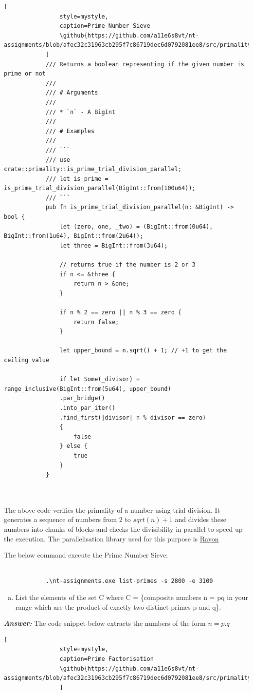 \documentclass[11pt,a4paper]{article}
\newcommand{\github}[1]{%
	\href{#1}{\faGithubSquare}%
}
\begin{document}
\begin{enumerate}[1.]
\begin{flushleft}
\begin{lstlisting}[
				style=mystyle, 
				caption=Prime Number Sieve
				\github{https://github.com/a11e6s8vt/nt-assignments/blob/afec32c31963cb295f7c86719dec6d0792081ee8/src/primality.rs\#L57}        
			]
			/// Returns a boolean representing if the given number is prime or not
			///
			/// # Arguments
			///
			/// * `n` - A BigInt
			///
			/// # Examples
			///
			/// ```
			/// use crate::primality::is_prime_trial_division_parallel;
			/// let is_prime = is_prime_trial_division_parallel(BigInt::from(100u64));
			/// ```
			pub fn is_prime_trial_division_parallel(n: &BigInt) -> bool {
				let (zero, one, _two) = (BigInt::from(0u64), BigInt::from(1u64), BigInt::from(2u64));
				let three = BigInt::from(3u64);
				
				// returns true if the number is 2 or 3
				if n <= &three {
					return n > &one;
				}
				
				if n % 2 == zero || n % 3 == zero {
					return false;
				}
				
				let upper_bound = n.sqrt() + 1; // +1 to get the ceiling value
				
				if let Some(_divisor) = range_inclusive(BigInt::from(5u64), upper_bound)
				.par_bridge()
				.into_par_iter()
				.find_first(|divisor| n % divisor == zero)
				{
					false
				} else {
					true
				}
			}

			
			\end{lstlisting}

			The above code verifies the primality of a number using trial division. It generates a sequence of numbers from $2$ to $sqrt(n) + 1$ and divides these numbers into chunks of blocks and checks the divisibility in parallel to speed up the execution. The parallelisation library used for this purpose is \href{https://crates.io/crates/rayon}{Rayon}
			
			\bigbreak
			The below command execute the Prime Number Sieve:
			\begin{lstlisting}[style=DOS, caption=Example command - Prime Number Sieve]

			.\nt-assignments.exe list-primes -s 2800 -e 3100
			\end{lstlisting}
		\end{flushleft}
		
		\begin{enumerate}[(b)]
			\item List the elements of the set C where C = \{composite numbers n = pq in your range which are the product of exactly two distinct primes p and q\}.
		\end{enumerate}
		\begin{flushleft}
			\textbf{\textit{Answer:}} The code snippet below extracts the numbers of the form $n = p.q$
			\begin{lstlisting}[
				style=mystyle, 
				caption=Prime Factorisation
				\github{https://github.com/a11e6s8vt/nt-assignments/blob/afec32c31963cb295f7c86719dec6d0792081ee8/src/primality.rs\#L57}        
				]
				

\end{lstlisting}
\end{flushleft}
\end{enumerate}
\end{document}
